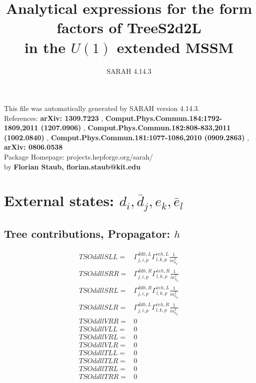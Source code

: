 \documentclass[A4,landscape]{article}
\begin{document}
\title{Analytical expressions for the form factors of TreeS2d2L\\ in the $U(1)$ extended MSSM } 
 \author{SARAH 4.14.3} 
 \maketitle 
 \vspace{10cm} 
This file was automatically generated by SARAH version 4.14.3.  \\ 
References: {\bf arXiv: 1309.7223 }, {\bf Comput.Phys.Commun.184:1792-1809,2011 (1207.0906) }, {\bf Comput.Phys.Commun.182:808-833,2011 (1002.0840) }, {\bf Comput.Phys.Commun.181:1077-1086,2010 (0909.2863) }, {\bf arXiv: 0806.0538 } \\ 
Package Homepage: projects.hepforge.org/sarah/ \\ 
by {\bf Florian Staub, florian.staub@kit.edu} 
 \pagebreak 
 \tableofcontents 
 \pagebreak 
\section{External states: ${d_{{i}}, \bar{d}_{{j}}, e_{{k}}, \bar{e}_{{l}}}$} 
\subsection{Tree contributions, Propagator: $h$} 

\begin{align} 
  TSOddllSLL= & \Gamma^{\bar{d}d h ,L}_{j, i, p} \Gamma^{\bar{e}e h ,L}_{l, k, p} \frac{1}{m^2_{h_{{p}}}} \\ 
  TSOddllSRR= & \Gamma^{\bar{d}d h ,R}_{j, i, p} \Gamma^{\bar{e}e h ,R}_{l, k, p} \frac{1}{m^2_{h_{{p}}}} \\ 
  TSOddllSRL= & \Gamma^{\bar{d}d h ,R}_{j, i, p} \Gamma^{\bar{e}e h ,L}_{l, k, p} \frac{1}{m^2_{h_{{p}}}} \\ 
  TSOddllSLR= & \Gamma^{\bar{d}d h ,L}_{j, i, p} \Gamma^{\bar{e}e h ,R}_{l, k, p} \frac{1}{m^2_{h_{{p}}}} \\ 
  TSOddllVRR= & 0 \\ 
  TSOddllVLL= & 0 \\ 
  TSOddllVRL= & 0 \\ 
  TSOddllVLR= & 0 \\ 
  TSOddllTLL= & 0 \\ 
  TSOddllTLR= & 0 \\ 
  TSOddllTRL= & 0 \\ 
  TSOddllTRR= & 0 \\ 
\end{align} 
\end{document}
